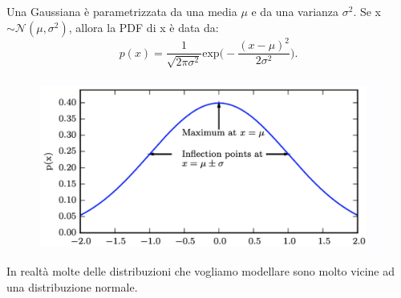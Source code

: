 Una Gaussiana è parametrizzata da una media $\mu$ e da una varianza $\sigma^2$. Se x$\sim\mathcal{N}(\mu,\sigma^2)$, allora la PDF di x è data da:
\begin{equation}
    p(x)=\frac{1}{\sqrt{2\pi\sigma^2}}\text{exp}\Big( -\frac{(x-\mu)^2}{2\sigma^2} \Big).
\end{equation}
\begin{figure}[!h]
    \includegraphics[scale=.5]{images/prerequisites/gaussian.png}
    \centering
\end{figure}



In realtà molte delle distribuzioni che vogliamo modellare sono molto vicine ad una distribuzione normale.
